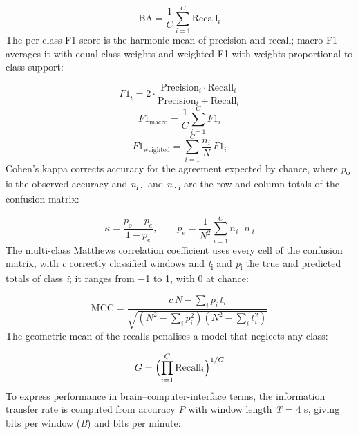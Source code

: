 \begin{equation}
  \mathrm{BA}=\frac{1}{C}\sum_{i=1}^{C}\mathrm{Recall}_i
  \label{eq:bacc}
\end{equation}
The per-class F1 score is the harmonic mean of precision and recall; macro F1 averages it with equal class weights and weighted F1 with weights proportional to class support:

\begin{equation}
  F1_i=2\cdot\frac{\mathrm{Precision}_i\cdot\mathrm{Recall}_i}{\mathrm{Precision}_i+\mathrm{Recall}_i}
  \label{eq:f1}
\end{equation}
\begin{equation}
  F1_{\mathrm{macro}}=\frac{1}{C}\sum_{i=1}^{C}F1_i
  \label{eq:macrof1}
\end{equation}
\begin{equation}
  F1_{\mathrm{weighted}}=\sum_{i=1}^{C}\frac{n_i}{N}\,F1_i
  \label{eq:wf1}
\end{equation}
Cohen’s kappa\cite{cohen} corrects accuracy for the agreement expected by chance, where \emph{p}\textsubscript{o} is the observed accuracy and \emph{n}\textsubscript{i·} and \emph{n}\textsubscript{·i} are the row and column totals of the confusion matrix:

\begin{equation}
  \kappa=\frac{p_o-p_e}{1-p_e},\qquad p_e=\frac{1}{N^{2}}\sum_{i=1}^{C}n_{i\cdot}\,n_{\cdot i}
  \label{eq:kappa}
\end{equation}
The multi-class Matthews correlation coefficient\cite{gorodkin,chicco} uses every cell of the confusion matrix, with \emph{c} correctly classified windows and \emph{t}\textsubscript{i} and \emph{p}\textsubscript{i} the true and predicted totals of class \emph{i}; it ranges from −1 to 1, with 0 at chance:

\begin{equation}
  \mathrm{MCC}=\frac{c\,N-\sum_{i}p_i\,t_i}{\sqrt{\left(N^{2}-\sum_{i}p_i^{2}\right)\left(N^{2}-\sum_{i}t_i^{2}\right)}}
  \label{eq:mcc}
\end{equation}
The geometric mean of the recalls\cite{kubat} penalises a model that neglects any class:

\begin{equation}
  G=\Bigl(\prod_{i=1}^{C}\mathrm{Recall}_i\Bigr)^{1/C}
  \label{eq:gmean}
\end{equation}
To express performance in brain–computer-interface terms, the information transfer rate\cite{wolpaw} is computed from accuracy \emph{P} with window length \emph{T} = 4 s, giving bits per window (\emph{B}) and bits per minute:

